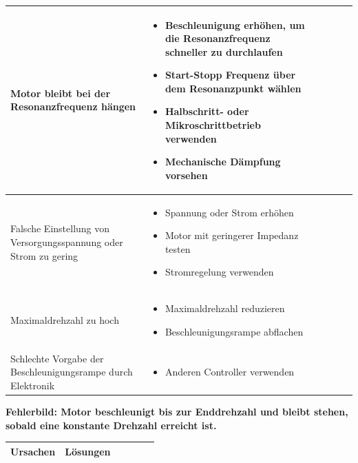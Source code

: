 {{{\begin{center}
\begin{tabularx}{\textwidth}{|X|X|X|X|X|X|}
					Motor bleibt bei der Resonanzfrequenz hängen & 
					\begin{itemize} 
						\item {Beschleunigung erhöhen, um die Resonanzfrequenz schneller zu durchlaufen} 
						\item {Start-Stopp Frequenz über dem Resonanzpunkt wählen} 
						\item {Halbschritt- oder Mikroschrittbetrieb verwenden} 
						\item {Mechanische Dämpfung vorsehen} 
					\end{itemize}	 \\	\hline
					Falsche Einstellung von Versorgungsspannung oder Strom zu gering & 
					\begin{itemize}
						\item {Spannung oder Strom erhöhen} 
						\item {Motor mit geringerer Impedanz testen} 
						\item {Stromregelung verwenden}
					\end{itemize}\\	\hline
					Maximaldrehzahl zu hoch & 
					\begin{itemize}
						\item {Maximaldrehzahl reduzieren} 
						\item {Beschleunigungsrampe abflachen}
					\end{itemize}\\ \hline
					Schlechte Vorgabe der Beschleunigungsrampe durch Elektronik & 
					\begin{itemize}
						\item {Anderen Controller verwenden }
					\end{itemize}\\ \hline
				\end{tabularx}
			\end{center}
			
			{\textbf{Fehlerbild: Motor beschleunigt bis zur Enddrehzahl und bleibt stehen, sobald eine konstante Drehzahl erreicht ist.}
				\begin{center}
					\fontsize{8}{10}\selectfont
					\begin{tabularx}{\textwidth}{|X|X|X|X|X|X|}
						\hline 
						\textbf{Ursachen} & \textbf{Lösungen} \\ \hline
						

\end{tabularx}
\end{center}}}}}
